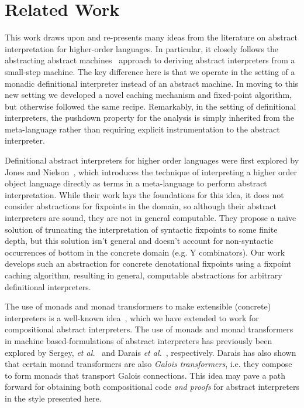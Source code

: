 \section{Related Work}

\cite{local:jones-ai1995}

This work draws upon and re-presents many ideas from the literature on abstract
interpretation for higher-order languages.  In particular, it closely follows
the abstracting abstract
machines~\cite{dvanhorn:VanHorn2010Abstracting,dvanhorn:VanHorn2012Systematic}
approach to deriving abstract interpreters from a small-step machine. The key
difference here is that we operate in the setting of a monadic definitional
interpreter instead of an abstract machine. In moving to this new setting we
developed a novel caching mechanism and fixed-point algorithm, but otherwise
followed the same recipe. Remarkably, in the setting of definitional
interpreters, the pushdown property for the analysis is simply inherited from
the meta-language rather than requiring explicit instrumentation to the
abstract interpreter.

Definitional abstract interpreters for higher order languages were first
explored by Jones and Nielson~\cite{local:jones-book1995}, which introduces the
technique of interpreting a higher order object language directly as terms in a
meta-language to perform abstract interpretation. While their work lays the
foundations for this idea, it does not consider abstractions for fixpoints in
the domain, so although their abstract interpreters are sound, they are not in
general computable. They propose a naïve solution of truncating the
interpretation of syntactic fixpoints to some finite depth, but this solution
isn't general and doesn't account for non-syntactic occurrences of bottom in
the concrete domain (e.g. Y combinators). Our work develops such an abstraction
for concrete denotational fixpoints using a fixpoint caching algorithm,
resulting in general, computable abstractions for arbitrary definitional
interpreters.

The use of monads and monad transformers to make extensible (concrete)
interpreters is a well-known
idea~\cite{davdar:Moggi:1989:Monads,local:steele-popl94,dvanhorn:Liang1995Monad},
which we have extended to work for compositional abstract interpreters.  The
use of monads and monad transformers in machine based-formulations of abstract
interpreters has previously been explored by Sergey, \emph{et
al.}~\cite{dvanhorn:Sergey2013Monadic} and Darais \emph{et
al.}~\cite{local:darais-oopsla2015}, respectively.  Darais has also shown that
certain monad transformers are also \emph{Galois transformers}, i.e. they
compose to form monads that transport Galois connections.  This idea may pave a
path forward for obtaining both compositional code \emph{and proofs} for
abstract interpreters in the style presented here.

